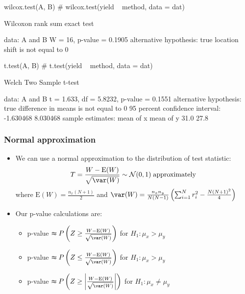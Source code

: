 \documentclass[a4paper]{article}\usepackage[]{graphicx}\usepackage[]{xcolor}
\begin{document}
\begin{Schunk}
\begin{Sinput}
wilcox.test(A, B) # wilcox.test(yield ~ method, data = dat)
\end{Sinput}
\begin{Soutput}

	Wilcoxon rank sum exact test

data:  A and B
W = 16, p-value = 0.1905
alternative hypothesis: true location shift is not equal to 0
\end{Soutput}
\begin{Sinput}
t.test(A, B) # t.test(yield ~ method, data = dat)
\end{Sinput}
\begin{Soutput}

	Welch Two Sample t-test

data:  A and B
t = 1.633, df = 5.8232, p-value = 0.1551
alternative hypothesis: true difference in means is not equal to 0
95 percent confidence interval:
 -1.630468  8.030468
sample estimates:
mean of x mean of y 
     31.0      27.8 
\end{Soutput}
\end{Schunk}
\subsubsection{Normal approximation}
	\begin{itemize}
		\item We can use a normal approximation to the distribution of test statistic:
		\[
			T = \frac{W - \mathrm{E}(W)}{\sqrt{\var (W)}} \sim \mathcal{N}(0,1) \;\text{approximately}
		\]
		where \( \mathrm{E}(W) = \frac{n_x (N+1)}{2} \) and \( \var (W) = \frac{n_x n_y}{N(N-1)} \left( \sum_{i=1}^{N} r_{i}^{2} - \frac{N (N+1)^2}{4} \right) \) 
		\item Our p-value calculations are:
		\begin{itemize}
			\item p-value \( \thickapprox P\left( Z \geq \frac{W-\mathrm{E}(W)}{\sqrt{\var(W)}} \right) \) for \( H_1: \mu_x > \mu_y \) 
			\item p-value \( \thickapprox P\left( Z \leq \frac{W-\mathrm{E}(W)}{\sqrt{\var(W)}} \right) \) for \( H_1: \mu_x > \mu_y \) 
			\item p-value \( \thickapprox P\left( Z \geq \left\vert \frac{W-\mathrm{E}(W)}{\sqrt{\var(W)}} \right\vert \right) \) for \( H_1: \mu_x \neq \mu_y \) 
		\end{itemize}
	\end{itemize}
\end{document}
